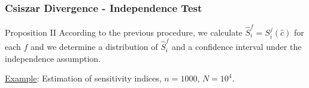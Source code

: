 \documentclass[8pt]{beamer}
\begin{document}
  
  
\begin{frame}
  \frametitle{Csiszar Divergence - Independence Test}
  \small
  
  \begin{block}{Proposition II}
   According to the previous procedure, we calculate $\hat{S}_i ^f = S_i^j(\hat{c})$ for each $f$ and  we determine a distribution of $\hat{S}_i ^f$ and a confidence interval under the independence assumption.
  \end{block}

 \underline{Example}: Estimation of sensitivity indices, $n=1000$, $N = 10^4$.
 \begin{center}
    \,
    \\[0.1em]

\end{center}
\end{frame}
\end{document}
